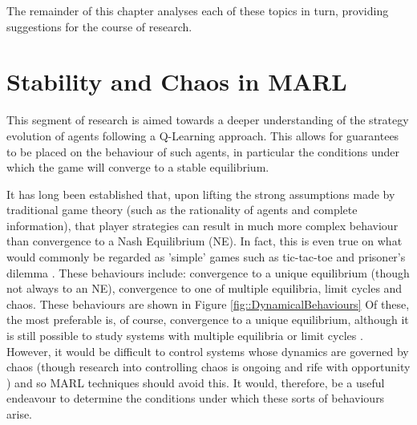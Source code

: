 \documentclass[.../main.tex]{subfiles}
\begin{document}
	The remainder of this chapter analyses each of these topics in turn, providing suggestions for
	the course of research.


    \section{Stability and Chaos in MARL} \label{sec::Chaos_in_MARL}

    This segment of research is aimed towards a deeper understanding
    of the strategy evolution of agents following a Q-Learning
    approach. This allows for guarantees to be placed on the behaviour
    of such agents, in particular the conditions under which the game
    will converge to a stable equilibrium.

    It has long been established that, upon lifting the strong
    assumptions made by traditional game theory (such as the
    rationality of agents and complete information), that player
    strategies can result in much more complex behaviour than
    convergence to a Nash Equilibrium (NE). In fact, this is even true
    on what would commonly be regarded as 'simple' games such as
    tic-tac-toe and prisoner's dilemma \cite{Galla2011,
      Sato2002}. These behaviours include: convergence to a unique
    equilibrium (though not always to an NE), convergence to one of
    multiple equilibria, limit cycles and chaos. These behaviours are
    shown in Figure \ref{fig::DynamicalBehaviours} Of these, the most
    preferable is, of course, convergence to a unique equilibrium,
    although it is still possible to study systems with multiple
    equilibria or limit cycles \cite{Strogatz2000}. However, it would
    be difficult to control systems whose dynamics are governed by
    chaos (though research into controlling chaos is ongoing and rife
    with opportunity \cite{Fradkov2009}) and so MARL techniques should
    avoid this. It would, therefore, be a useful endeavour to
    determine the conditions under which these sorts of behaviours
    arise.
\end{document}
